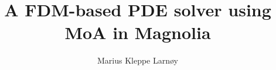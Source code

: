 \documentclass{article}
\author{Marius Kleppe Larnøy}
\begin{document}
\title{A FDM-based PDE solver using MoA in Magnolia}
\maketitle
\end{document}

